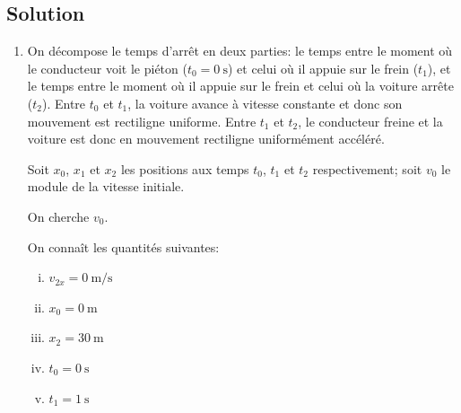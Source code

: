 \documentclass{tufte-handout}
\begin{document}
\subsection{Solution}

\begin{enumerate}[a]
  \begin{marginfigure}
  \end{marginfigure}
  \item On décompose le temps d'arrêt en deux parties: le temps entre le moment
    où le conducteur voit le piéton ($t_0 = \SI{0}{\second}$) et celui où il
    appuie sur le frein ($t_1$), et le temps entre le moment où il appuie sur
    le frein et celui où la voiture arrête ($t_2$).  Entre $t_0$ et $t_1$, la
    voiture avance à vitesse constante et donc son mouvement est rectiligne
    uniforme.  Entre $t_1$ et $t_2$, le conducteur freine et la voiture est
    donc en mouvement rectiligne uniformément accéléré.

    Soit $x_0$, $x_1$ et $x_2$ les positions aux temps $t_0$, $t_1$ et $t_2$
    respectivement; soit $v_0$ le module de la vitesse initiale.  

    On cherche $v_{0}$.

    On connaît les quantités suivantes:
    \begin{enumerate}[i.]
      \item $v_{2x} = \SI{0}{\meter\per\second}$
      \item $x_0 = \SI{0}{\meter}$
      \item $x_2 = \SI{30}{\meter}$
      \item $t_0 = \SI{0}{\second}$
      \item $t_1 = \SI{1}{\second}$
    \end{enumerate}


\end{enumerate}
\end{document}
